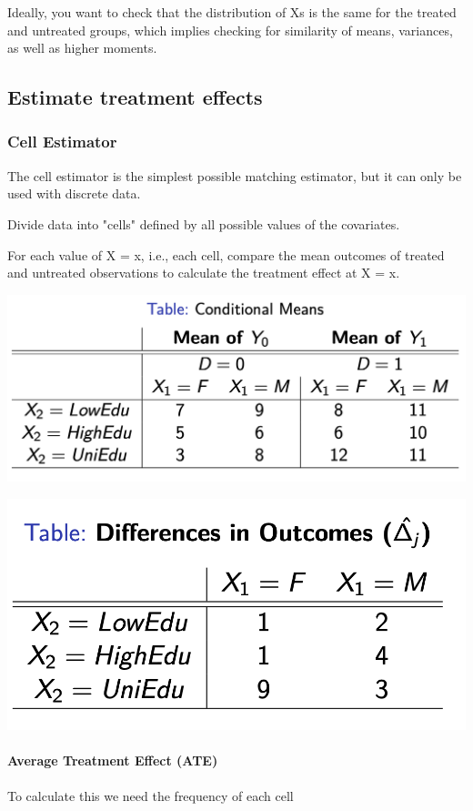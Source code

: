 \documentclass[a3paper, 8pt]{extarticle}
\begin{document}
\begin{multicols*}{5}
Ideally, you want to check that the distribution of Xs is the same for the treated and untreated groups, which implies checking for similarity of means, variances, as well as higher moments.


\subsection{Estimate treatment effects}

\subsubsection{Cell Estimator}
The cell estimator is the simplest possible matching estimator, but it can only be used with discrete data.

Divide data into "cells" defined by all possible values of the covariates.

For each value of X = x, i.e., each cell, compare the mean outcomes of treated and untreated observations to calculate the treatment effect at X = x.

\begin{center}
    \includegraphics[width = 0.8 \columnwidth]{Screen Shot 2023-03-23 at 18.14.12.png}

\includegraphics[width = 0.55 \columnwidth]{Screen Shot 2023-03-23 at 19.20.17.png}
\end{center}

\paragraph{Average Treatment Effect (ATE)}
To calculate this we need the frequency of each cell


\end{multicols*}
\end{document}
